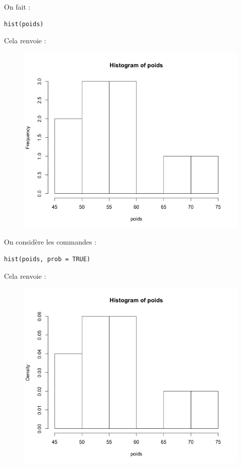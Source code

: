 On fait :
\begin{lstlisting}[language=html]
hist(poids)
\end{lstlisting}
Cela renvoie :
\begin{figure}[H]\begin{center}\includegraphics[scale=0.4]{ilu/gra42.png}\end{center}\end{figure}
On considère les commandes :
\begin{lstlisting}[language=html]
hist(poids, prob = TRUE)
\end{lstlisting}
Cela renvoie :
\begin{figure}[H]\begin{center}\includegraphics[scale=0.4]{ilu/gra43.png}\end{center}\end{figure}
